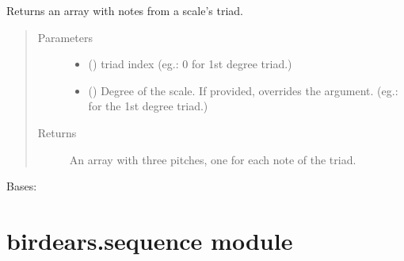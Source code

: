 \documentclass[letterpaper,10pt,english]{sphinxmanual}
\begin{document}
\begin{fulllineitems}
\begin{fulllineitems}
\label{\detokenize{birdears:birdears.scale.DiatonicScale.get_triad}}
Returns an array with notes from a scale’s triad.
\begin{quote}\begin{description}
\item[{Parameters}] \leavevmode\begin{itemize}
\item {} 
 () \textendash{} triad index (eg.: 0 for 1st degree triad.)

\item {} 
 () \textendash{} Degree of the scale. If provided, overrides the
 argument. (eg.:  for the 1st degree triad.)

\end{itemize}

\item[{Returns}] \leavevmode
An array with three pitches, one for each note of the triad.

\end{description}\end{quote}

\end{fulllineitems}


\end{fulllineitems}


\begin{fulllineitems}
\label{\detokenize{birdears:birdears.scale.ScaleBase}}
Bases: 

\end{fulllineitems}



\section{birdears.sequence module}
\label{\detokenize{birdears:module-birdears.sequence}}\label{\detokenize{birdears:birdears-sequence-module}}
\end{document}

